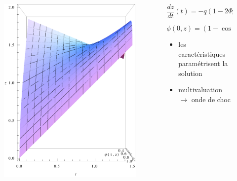 \documentclass[xcolor=dvipsnames]{beamer}
\newcommand{\tot}[2]{\ensuremath{\frac{d {#1}}{d {#2}}}}
\begin{document}
\begin{frame}

\begin{columns}

\begin{column}{5cm}

\begin{figure}[htp]
\centering
\includegraphics[scale=0.50]{img/surface.pdf}
\label{}
\end{figure}

\end{column}

\begin{column}{5cm}

\[
		\tot{z}{t}(t) = - q  \left( 1-2\Phi_0 \right)
\]

\[
\phi(0,z) = (1 - \cos z/z_0)/2
\]

\begin{itemize}
\item les caractéristiques paramétrisent la solution
\item multivaluation $\rightarrow$ onde de choc
\end{itemize}

\end{column}

\end{columns}

\end{frame}
\end{document}
